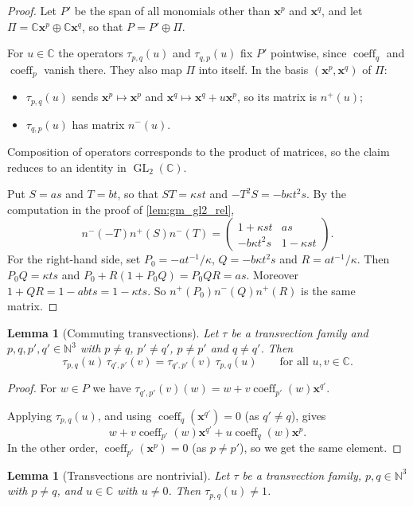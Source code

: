\documentclass[11pt]{article}
\newtheorem{lemma}[theorem]{Lemma}
\theoremstyle{definition}
\theoremstyle{remark}
\newcommand{\CC}{\mathbb{C}}
\newcommand{\NN}{\mathbb{N}}
\DeclareMathOperator{\GL}{GL}
\DeclareMathOperator{\coeff}{coeff}
\begin{document}
\begin{proof}
Let $P'$ be the span of all monomials other than $\mathbf x^p$ and $\mathbf x^q$, and let $\Pi=\CC\mathbf x^p\oplus\CC\mathbf x^q$, so that $P=P'\oplus\Pi$.

For $u\in\CC$ the operators $\tau_{p,q}(u)$ and $\tau_{q,p}(u)$ fix $P'$ pointwise, since $\coeff_q$ and $\coeff_p$ vanish there. They also map $\Pi$ into itself. In the basis $(\mathbf x^p,\mathbf x^q)$ of $\Pi$:
\begin{itemize}
\item $\tau_{p,q}(u)$ sends $\mathbf x^p\mapsto\mathbf x^p$ and $\mathbf x^q\mapsto\mathbf x^q+u\mathbf x^p$, so its matrix is $n^+(u)$;
\item $\tau_{q,p}(u)$ has matrix $n^-(u)$.
\end{itemize}
Composition of operators corresponds to the product of matrices, so the claim reduces to an identity in $\GL_2(\CC)$.

Put $S=as$ and $T=bt$, so that $ST=\kappa st$ and $-T^2S=-b\kappa t^2s$. By the computation in the proof of \cref{lem:gm_gl2_rel},
\[
n^-(-T)n^+(S)n^-(T)=\begin{pmatrix}1+\kappa st&as\\-b\kappa t^2s&1-\kappa st\end{pmatrix}.
\]
For the right-hand side, set $P_0=-at^{-1}/\kappa$, $Q=-b\kappa t^2s$ and $R=at^{-1}/\kappa$. Then $P_0Q=\kappa ts$ and $P_0+R(1+P_0Q)=P_0QR=as$. Moreover $1+QR=1-abts=1-\kappa ts$. So $n^+(P_0)n^-(Q)n^+(R)$ is the same matrix.
\end{proof}

\begin{lemma}[Commuting transvections]\label{lem:gm_tau_comm}
Let $\tau$ be a transvection family and $p,q,p',q'\in\NN^3$ with $p\neq q$, $p'\neq q'$, $p\ne p'$ and $q\neq q'$. Then
\[
\tau_{p,q}(u)\,\tau_{q',p'}(v)=\tau_{q',p'}(v)\,\tau_{p,q}(u)\qquad\text{for all } u,v\in\CC.
\]
\end{lemma}

\begin{proof}
For $w\in P$ we have $\tau_{q',p'}(v)(w)=w+v\coeff_{p'}(w)\mathbf x^{q'}$.

Applying $\tau_{p,q}(u)$, and using $\coeff_q(\mathbf x^{q'})=0$ (as $q'\neq q$), gives
\[
w+v\coeff_{p'}(w)\mathbf x^{q'}+u\coeff_q(w)\mathbf x^p .
\]
In the other order, $\coeff_{p'}(\mathbf x^p)=0$ (as $p\ne p'$), so we get the same element.
\end{proof}

\begin{lemma}[Transvections are nontrivial]\label{lem:gm_tau_ne_one}
Let $\tau$ be a transvection family, $p,q\in\NN^3$ with $p\neq q$, and $u\in\CC$ with $u\neq0$. Then $\tau_{p,q}(u)\neq 1$.
\end{lemma}
\end{document}
